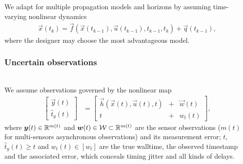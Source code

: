 \documentclass{ifacconf}
\begin{document}
We adapt for multiple propagation models and horizons by assuming time-varying nonlinear dynamics 
\begin{align}
  \vec{x}(t_{k}) = \vec{f}\left(\vec{x}(t_{k-1}),\vec{u}(t_{k-1}), t_{k-1}, t_{k}\right) + \vec{q}(t_{k-1}),
  \label{eq:setfilter_plant}
\end{align}
where the designer may choose the most advantageous model.

\subsubsection{Uncertain observations}~\\
We assume observations governed by the nonlinear map %
\begin{align}
  \begin{bmatrix}
    \vec{y}(t) \\ \hat{t}_y(t)
  \end{bmatrix}
  &=
    \begin{bmatrix}
      \vec{h}(\vec{x}(t), \vec{u}(t), t) &+& \vec{w}(t) \\
      t &+& w_t(t)
    \end{bmatrix},%
    \label{eq:setfilter_obs2}
\end{align}
where ${\boldsymbol{y}(t) \in \mathbb{R}^{m(t)}}$
and ${\boldsymbol{w}(t) \in \mathcal{W} \subset \mathbb{R}^{m(t)}}$ 
are the sensor observations ($m(t)$ for multi-sensors asynchronous observations) and its measurement error;
$t$, ${\hat{t}_y(t) \geq t}$ and
${w_t(t)  \in [w_t] }$ 
are
the true walltime,
the observed timestamp and the associated error,
which conceals timing jitter and all kinds of delays.
\end{document}
